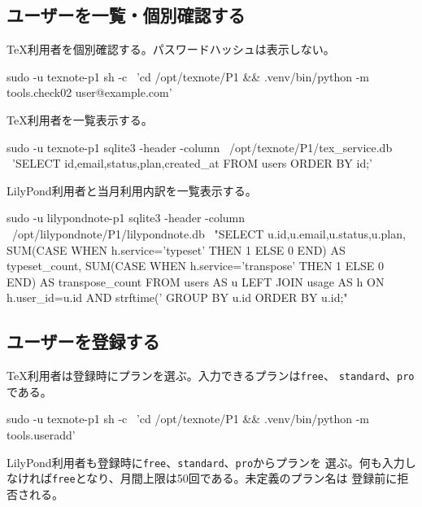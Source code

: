 \documentclass[uplatex,a4paper,11pt]{jsarticle}
\begin{document}
\subsection{ユーザーを一覧・個別確認する}

TeX利用者を個別確認する。パスワードハッシュは表示しない。

\begin{command}
sudo -u texnote-p1 sh -c \
  'cd /opt/texnote/P1 && .venv/bin/python -m tools.check02 user@example.com'
\end{command}

TeX利用者を一覧表示する。

\begin{command}
sudo -u texnote-p1 sqlite3 -header -column \
  /opt/texnote/P1/tex_service.db \
  'SELECT id,email,status,plan,created_at FROM users ORDER BY id;'
\end{command}

LilyPond利用者と当月利用内訳を一覧表示する。

\begin{command}
sudo -u lilypondnote-p1 sqlite3 -header -column \
  /opt/lilypondnote/P1/lilypondnote.db \
  "SELECT u.id,u.email,u.status,u.plan,
          SUM(CASE WHEN h.service='typeset' THEN 1 ELSE 0 END) AS typeset_count,
          SUM(CASE WHEN h.service='transpose' THEN 1 ELSE 0 END) AS transpose_count
   FROM users AS u
   LEFT JOIN usage AS h ON h.user_id=u.id
     AND strftime('%
   GROUP BY u.id ORDER BY u.id;"
\end{command}



\subsection{ユーザーを登録する}

TeX利用者は登録時にプランを選ぶ。入力できるプランは\texttt{free}、
\texttt{standard}、\texttt{pro}である。

\begin{command}
sudo -u texnote-p1 sh -c \
  'cd /opt/texnote/P1 && .venv/bin/python -m tools.useradd'
\end{command}

LilyPond利用者も登録時に\texttt{free}、\texttt{standard}、\texttt{pro}からプランを
選ぶ。何も入力しなければ\texttt{free}となり、月間上限は50回である。未定義のプラン名は
登録前に拒否される。
\end{document}
